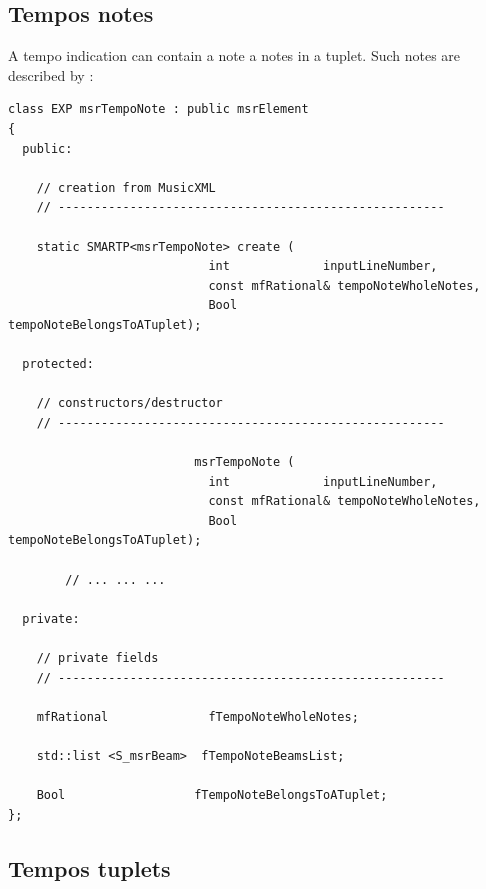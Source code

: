 \subsection{Tempos notes}\label{Tempos notes}

A tempo indication can contain a note a notes in a tuplet. Such notes are described by :
\begin{lstlisting}[language=CPlusPlus]
class EXP msrTempoNote : public msrElement
{
  public:

    // creation from MusicXML
    // ------------------------------------------------------

    static SMARTP<msrTempoNote> create (
                            int             inputLineNumber,
                            const mfRational& tempoNoteWholeNotes,
                            Bool            tempoNoteBelongsToATuplet);

  protected:

    // constructors/destructor
    // ------------------------------------------------------

                          msrTempoNote (
                            int             inputLineNumber,
                            const mfRational& tempoNoteWholeNotes,
                            Bool            tempoNoteBelongsToATuplet);

		// ... ... ...

  private:

    // private fields
    // ------------------------------------------------------

    mfRational              fTempoNoteWholeNotes;

    std::list <S_msrBeam>  fTempoNoteBeamsList;

    Bool                  fTempoNoteBelongsToATuplet;
};
\end{lstlisting}

\subsection{Tempos tuplets}\label{Tempos tuplets}


